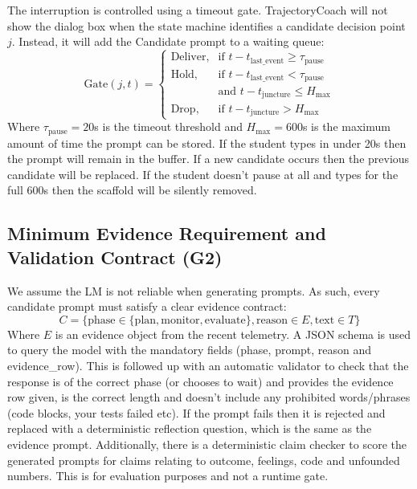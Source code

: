 \documentclass[conference]{IEEEtran}
\begin{document}
The interruption is controlled using a timeout gate. TrajectoryCoach will not show the dialog box when the state machine identifies a candidate decision point $j$. Instead, it will add the Candidate prompt to a waiting queue:
{\small
\begin{equation}
\mathrm{Gate}(j, t) =
\begin{cases}
\text{Deliver}, & \text{if } t - t_{\text{last\_event}} \geq \tau_{\text{pause}}\\
\text{Hold}, & \text{if } t - t_{\text{last\_event}} < \tau_{\text{pause}}\\
 & \text{and } t - t_{\text{juncture}} \leq H_{\max}\\
\text{Drop}, & \text{if } t - t_{\text{juncture}} > H_{\max}
\end{cases}
\end{equation}}
\noindent Where $\tau_{\text{pause}} = 20$s is the timeout threshold and $H_{\max} = 600$s is the maximum amount of time the prompt can be stored. If the student types in under 20s then the prompt will remain in the buffer. If a new candidate occurs then the previous candidate will be replaced. If the student doesn't pause at all and types for the full 600s then the scaffold will be silently removed.

\subsection{Minimum Evidence Requirement and Validation Contract (G2)}

We assume the LM is not reliable when generating prompts. As such, every candidate prompt must satisfy a clear evidence contract:
{\small
\begin{equation}
C = \{\text{phase} \in \{\text{plan}, \text{monitor}, \text{evaluate}\}, \text{reason} \in E, \text{text} \in T\}
\end{equation}}
\noindent Where $E$ is an evidence object from the recent telemetry. A JSON schema is used to query the model with the mandatory fields (phase, prompt, reason and evidence\_row). This is followed up with an automatic validator to check that the response is of the correct phase (or chooses to wait) and provides the evidence row given, is the correct length and doesn't include any prohibited words/phrases (code blocks, your tests failed etc). If the prompt fails then it is rejected and replaced with a deterministic reflection question, which is the same as the evidence prompt. Additionally, there is a deterministic claim checker to score the generated prompts for claims relating to outcome, feelings, code and unfounded numbers. This is for evaluation purposes and not a runtime gate.
\end{document}
